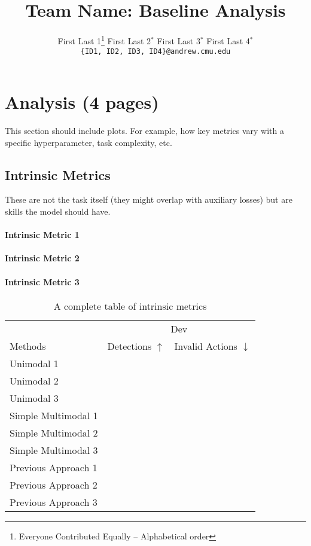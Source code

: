 \documentclass{article} %
\title{Team Name: Baseline Analysis}
\author{
  First Last 1\thanks{\hspace{4pt}Everyone Contributed Equally -- Alphabetical order} \hspace{2em} First Last 2$^*$ \hspace{2em} First Last 3$^*$ \hspace{2em} First Last 4$^*$ \\
  \texttt{\{ID1, ID2, ID3, ID4\}@andrew.cmu.edu}
  }
\date{}
\begin{document}
\maketitle


\section{Analysis (4 pages)}
 This section should include plots.  For example, how key metrics vary with a specific hyperparameter, task complexity, etc.

\subsection{ Intrinsic Metrics}
These are not the task itself (they might overlap with auxiliary losses) but are skills the model should have.

\paragraph{Intrinsic Metric 1}
\paragraph{Intrinsic Metric 2}
\paragraph{Intrinsic Metric 3}

\clearpage

\begin{table}[t]
\centering
\begin{tabular}{@{}lrr@{}}
\toprule
                            & \multicolumn{2}{c}{Dev} \\
Methods                     & Detections $\uparrow$ & Invalid Actions $\downarrow$  \\
\midrule
Unimodal 1 \cite{} & & \\
Unimodal 2 \cite{} & & \\
Unimodal 3 \cite{} & & \\
\midrule
Simple Multimodal 1 \cite{} & &  \\
Simple Multimodal 2 \cite{} & &  \\
Simple Multimodal 3 \cite{} & &  \\
\midrule
Previous Approach 1 \cite{} & &  \\
Previous Approach 2 \cite{} & &  \\
Previous Approach 3 \cite{} & &  \\
\bottomrule
\end{tabular}
\label{tab:intrinsic}
\caption{ A complete table of intrinsic metrics}
\end{table}
\end{document}
